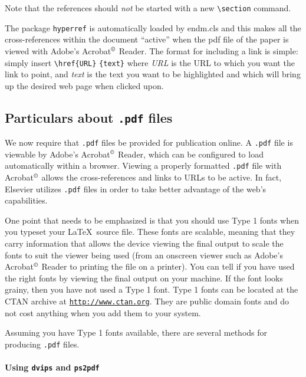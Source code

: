 \documentclass{endm}
\begin{document}
Note that the references should \emph{not} be started with a new
\verb+\section+ command.

The package \texttt{hyperref} is automatically loaded by endm.cls and
this makes all the cross-references within the document ``active'' when
the pdf file of the paper is viewed with Adobe's Acrobat$^{\copyright}$
Reader. The format for including a link is simple: simply
insert \verb+\href{URL}+ \verb+{text}+ where \emph{URL} is the URL to
which you want the link to point, and \emph{text} is the text you want
to be highlighted and which will bring up the desired web page when
clicked upon.

\subsection{Particulars about {\normalshape \texttt{.pdf} files}}

We now require that \texttt{.pdf} files be provided for publication
online. A \texttt{.pdf} file is viewable by Adobe's Acrobat$^{\copyright}$
Reader, which can be configured to load automatically within a browser.
Viewing a properly formatted \texttt{.pdf} file with Acrobat$^{\copyright}$
allows the cross-references and links to URLs to be active. In fact,
Elsevier utilizes \texttt{.pdf} files in order to take better advantage
of the web's capabilities.

One point that needs to be emphasized is that you should use Type 1
fonts when you typeset your \LaTeX\ source file. These fonts are
scalable, meaning that they carry information that allows the device
viewing the final output to scale the fonts to suit the viewer being
used (from an onscreen viewer such as Adobe's Acrobat$^{\copyright}$
Reader to printing the file on a printer). You can tell if you have
used the right fonts by viewing the final output on your machine. If
the font looks grainy, then you have not used a Type 1 font. Type 1
fonts can be located at the CTAN archive at
\href{http://www.ctan.org}{\tt http://www.ctan.org}. They are public
domain fonts and do not cost anything when you add them to your system.

Assuming you have Type 1 fonts available, there are several methods
for producing \texttt{.pdf} files.

\paragraph{Using \texttt{dvips} and \texttt{ps2pdf}}
\end{document}
